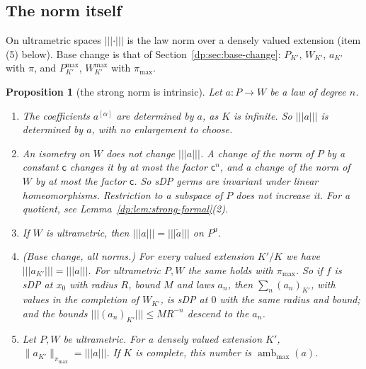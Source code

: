 \documentclass[11pt]{amsart}
\newtheorem{proposition}[theorem]{Proposition}
\theoremstyle{definition}
\theoremstyle{remark}
\numberwithin{equation}{section}
\newcommand{\norm}[1]{\lVert #1\rVert}
\theoremstyle{plain}
\theoremstyle{definition}
\theoremstyle{plain}
\begin{document}
\subsection{The norm itself}\label{dp:s:ssec-norm}

On ultrametric spaces $\lvert\!\lvert\!\lvert \cdot\rvert\!\rvert\!\rvert$ is the law norm over a densely valued extension (item (5) below). Base change is that of Section~\ref{dp:sec:base-change}: $P_{K'}$, $W_{K'}$, $a_{K'}$ with $\pi$, and $P^{\max}_{K'}$, $W^{\max}_{K'}$ with $\pi_{\max}$.

\begin{proposition}[the strong norm is intrinsic]\label{dp:prop:strong-intrinsic}
Let $a\colon P\to W$ be a law of degree $n$.
\begin{enumerate}
\item The coefficients $a^{[\alpha]}$ are determined by $a$, as $K$ is infinite. So $\lvert\!\lvert\!\lvert a\rvert\!\rvert\!\rvert$ is determined by $a$, with no enlargement to choose.
\item An isometry on $W$ does not change $\lvert\!\lvert\!\lvert a\rvert\!\rvert\!\rvert$. A change of the norm of $P$ by a constant $\mathsf c$ changes it by at most the factor $\mathsf c^n$, and a change of the norm of $W$ by at most the factor $\mathsf c$. So sDP germs are invariant under linear homeomorphisms. Restriction to a subspace of $P$ does not increase it. For a quotient, see Lemma~\ref{dp:lem:strong-formal}(2).
\item If $W$ is ultrametric, then $\lvert\!\lvert\!\lvert a\rvert\!\rvert\!\rvert=\lvert\!\lvert\!\lvert \tilde a\rvert\!\rvert\!\rvert$ on $P^{\mathsf u}$.
\item \textup{(Base change, all norms.)} For every valued extension $K'/K$ we have $\lvert\!\lvert\!\lvert a_{K'}\rvert\!\rvert\!\rvert=\lvert\!\lvert\!\lvert a\rvert\!\rvert\!\rvert$. For ultrametric $P,W$ the same holds with $\pi_{\max}$. So if $f$ is sDP at $x_0$ with radius $R$, bound $M$ and laws $a_n$, then $\sum_n(a_n)_{K'}$, with values in the completion of $W_{K'}$, is sDP at $0$ with the same radius and bound; and the bounds $\lvert\!\lvert\!\lvert (a_n)_{K'}\rvert\!\rvert\!\rvert\le MR^{-n}$ descend to the $a_n$.
\item Let $P,W$ be ultrametric. For a densely valued extension $K'$, $\norm{a_{K'}}_{\pi_{\max}}=\lvert\!\lvert\!\lvert a\rvert\!\rvert\!\rvert$. If $K$ is complete, this number is $\operatorname{amb}_{\max}(a)$.
\end{enumerate}
\end{proposition}
\end{document}
